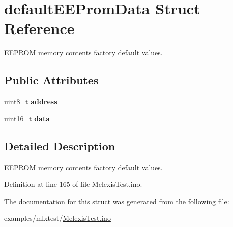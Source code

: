 \hypertarget{structdefault_e_e_prom_data}{\section{default\-E\-E\-Prom\-Data Struct Reference}
\label{structdefault_e_e_prom_data}
}


E\-E\-P\-R\-O\-M memory contents factory default values.  


\subsection*{Public Attributes}
\begin{DoxyCompactItemize}
\item 
\hypertarget{structdefault_e_e_prom_data_af1dad8ee7eace389e3dcecbedcd9af04}{uint8\-\_\-t {\bfseries address}}\label{structdefault_e_e_prom_data_af1dad8ee7eace389e3dcecbedcd9af04}

\item 
\hypertarget{structdefault_e_e_prom_data_abb3e4be9656ea9b20f05a1288c09020a}{uint16\-\_\-t {\bfseries data}}\label{structdefault_e_e_prom_data_abb3e4be9656ea9b20f05a1288c09020a}

\end{DoxyCompactItemize}


\subsection{Detailed Description}
E\-E\-P\-R\-O\-M memory contents factory default values. 

Definition at line 165 of file Melexis\-Test.\-ino.



The documentation for this struct was generated from the following file\-:\begin{DoxyCompactItemize}
\item 
examples/mlxtest/\hyperlink{_melexis_test_8ino}{Melexis\-Test.\-ino}\end{DoxyCompactItemize}
